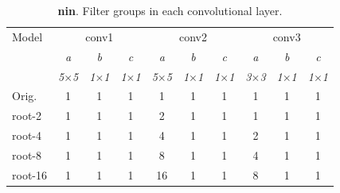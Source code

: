 \documentclass[thesis]{subfiles}
\begin{document}
	\begin{table}[tbp]
		\caption[\Gls{nin} root architectures]{\textbf{\Gls{nin}}. Filter groups in each convolutional layer.}
		\label{table:ninconfig}
		\centering
		\begin{tabular}{@{}lccccccccc@{}}
			\toprule
			Model & \multicolumn{3}{c}{conv1} & \multicolumn{3}{c}{conv2} & \multicolumn{3}{c}{conv3} \\
			& \textit{\footnotesize a} & \textit{\footnotesize b} & \textit{\footnotesize c} & \textit{\footnotesize a} & \textit{\footnotesize b} & \textit{\footnotesize c} & \textit{\footnotesize a} & \textit{\footnotesize b} & \textit{\footnotesize c} \\
			& \textit{\footnotesize5$\times$5} & \textit{\footnotesize1$\times$1} & \textit{\footnotesize1$\times$1} & \textit{\footnotesize5$\times$5} & \textit{\footnotesize1$\times$1} & \textit{\footnotesize1$\times$1} & \textit{\footnotesize3$\times$3} & \textit{\footnotesize1$\times$1} & \textit{\footnotesize1$\times$1} \\
			Orig. & 1 & 1 & 1 & 1 & 1 & 1 & 1 & 1 & 1\\
			\midrule
			root-2 & 1 & 1 & 1 & 2 & 1 & 1 & 1 & 1 & 1\\
			root-4 & 1 & 1 & 1 & 4 & 1 & 1 & 2 & 1 & 1\\
			root-8 & 1 & 1 & 1 & 8 & 1 & 1 & 4 & 1 & 1\\
			root-16 & 1 & 1 & 1 & 16 & 1 & 1 & 8 & 1 & 1\\
			\bottomrule
		\end{tabular}
	\end{table}
\end{document}
